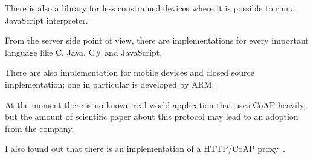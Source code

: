 	There is also a library for less constrained devices where it is possible to run a JavaScript interpreter.\newline
	
	From the server side point of view, there are implementations for every important language like C, Java, C\# and JavaScript.\newline
	
	There are also implementation for mobile devices and closed source implementation; one in particular is developed by ARM.\newline
	
	At the moment there is no known real world application that uses CoAP heavily, but the amount of scientific paper about this protocol may lead to an adoption from the company.
	\newline
	
	I also found out that there is an implementation of a HTTP/CoAP proxy~\cite{rossini2012design}.